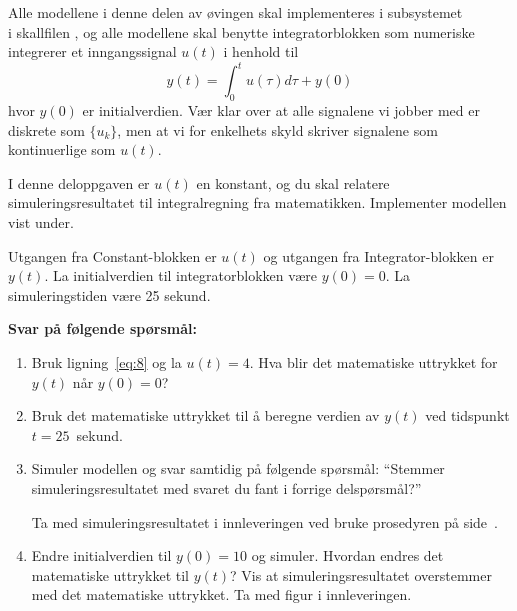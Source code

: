
\item[]   Alle modellene i denne delen av øvingen skal implementeres
  i subsystemet\\
   i 
  skallfilen , og alle modellene skal 
  benytte integratorblokken som numeriske integrerer
  et  inngangssignal $u(t)$ i henhold til
  \begin{equation}
    \label{eq:8}
  y(t) = \int_{0}^{t} u(\tau) d\tau + y(0)
\end{equation}
hvor $y(0)$ er initialverdien.
Vær klar over at alle signalene vi jobber med er
diskrete som $\{u_{k}\}$, men at vi for enkelhets skyld skriver
signalene som kontinuerlige som $u(t)$.



  
\item


  I denne deloppgaven er $u(t)$ en konstant, og du skal relatere
  simuleringsresultatet til integralregning fra matematikken.
  Implementer modellen vist under.
  \begin{figure}[H]
    \centering
    \hspace*{0mm}
  \end{figure}
  Utgangen fra {\sf  Constant}-blokken 
  er $u(t)$ og utgangen fra {\sf  Integrator}-blokken
  er  $y(t)$. La  initialverdien til integratorblokken være
  $y(0){=}0$.   {\color{red}La simuleringstiden være 25 sekund.}

  
{\bf Svar på følgende spørsmål:    }
  \begin{enumerate}[label=a\arabic*)]
  \item  Bruk ligning~\eqref{eq:8} og  la $u(t){=}4$. Hva blir det
    matematiske uttrykket for $y(t)$ når $y(0){=}0$?  

  \item  Bruk det matematiske uttrykket til å beregne verdien av $y(t)$ ved
     tidspunkt  $t{=}25$~sekund.
  
   \item Simuler modellen og svar samtidig på følgende spørsmål:
     ``Stemmer simulerings\-resultatet med svaret du fant i  forrige
     delspørsmål?''

     Ta med simulerings\-resultatet i
     innleveringen ved bruke prosedyren på
     side~\pageref{page:prosedyre}.
     
\item  Endre initialverdien til $y(0){=}10$ og simuler. Hvordan endres
  det matematiske uttrykket til $y(t)$? Vis at 
  simuleringsresultatet overstemmer med det matematiske uttrykket. Ta
  med figur i innleveringen.

\end{enumerate}
